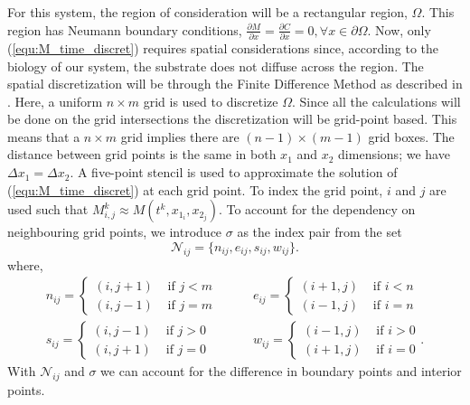 For this system, the region of consideration will be a rectangular region, $\Omega$.
This region has Neumann boundary conditions, $\frac{\partial M}{\partial x} = \frac{\partial C}{\partial x} = 0, \forall x \in \partial \Omega$.
Now, only (\ref{equ:M_time_discret}) requires spatial considerations since, according to the biology of our system, the substrate does not diffuse across the region.
The spatial discretization will be through the Finite Difference Method as described in \cite{saad2003iterativeMethod}.
Here, a uniform $n \times m$ grid is used to discretize $\Omega$.
Since all the calculations will be done on the grid intersections the discretization will be grid-point based.
This means that a $n \times m$ grid implies there are $(n-1) \times (m-1)$ grid boxes.
The distance between grid points is the same in both $x_1$ and $x_2$ dimensions; we have $\Delta x_1 = \Delta x_2$.
A five-point stencil is used to approximate the solution of (\ref{equ:M_time_discret}) at each grid point.
To index the grid point, $i$ and $j$ are used such that $M^{k}_{i,j} \approx M(t^{k}, x_{1_i}, x_{2_j})$.
To account for the dependency on neighbouring grid points, we introduce $\sigma$ as the index pair from the set 
\begin{equation}\label{equ:neighbour}
  \mathcal{N}_{ij} = \{n_{ij}, e_{ij}, s_{ij}, w_{ij}\}.
\end{equation}
where, 
\begin{equation}
  \begin{aligned}
    n_{ij} = \begin{cases} 
      (i,j+1)  & \text{ if } j < m \\
      (i,j-1)  & \text{ if } j = m \end{cases}
    & \qquad 
    e_{ij} = \begin{cases}
      (i+1,j)  & \text{ if } i < n \\
      (i-1,j)  & \text{ if } i = n \end{cases}
    \\
    s_{ij} = \begin{cases}
      (i,j-1)  & \text{ if } j > 0 \\
      (i,j+1)  & \text{ if } j = 0 \end{cases}
    & \qquad 
    w_{ij} = \begin{cases}
      (i-1,j)  & \text{ if } i > 0\\
      (i+1,j)  & \text{ if } i = 0 \end{cases}.
  \end{aligned}
\end{equation}
With $\mathcal{N}_{ij}$ and $\sigma$ we can account for the difference in boundary points and interior points.

